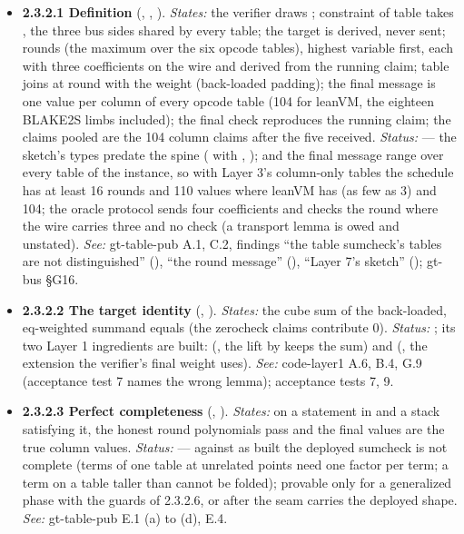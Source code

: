 \begin{itemize}[label={}, leftmargin=1.3em, itemindent=-1.3em, labelwidth=0pt, labelsep=0pt, itemsep=4pt, topsep=3pt]
\item {}\label{obl:node-2.3.2.1}\oblflag\textbf{2.3.2.1 Definition} (, , ). \emph{States:} the verifier draws ; constraint  of table  takes , the three bus sides  shared by every table; the target  is derived, never sent;  rounds (the maximum over the six opcode tables), highest variable first, each with three coefficients  on the wire and  derived from the running claim; table  joins at round  with the weight  (back-loaded padding); the final message is one value per column of every opcode table (104 for leanVM, the eighteen BLAKE2S limbs included); the final check reproduces the running claim; the claims pooled are the 104 column claims after the five received. \emph{Status:}   — the sketch's types predate the spine ( with , );  and the final message range over every table of the instance, so with Layer 3's column-only tables the schedule has at least 16 rounds and 110 values where leanVM has  (as few as 3) and 104; the oracle protocol sends four coefficients and checks the round where the wire carries three and no check (a transport lemma is owed and unstated). \emph{See:} gt-table-pub A.1, C.2, findings ``the table sumcheck's tables are not distinguished'' (), ``the round message'' (), ``Layer 7's sketch'' (); gt-bus §G16.
\item {}\label{obl:node-2.3.2.2}\textbf{2.3.2.2 The target identity} (, ). \emph{States:} the cube sum of the back-loaded, eq-weighted summand equals  (the zerocheck claims contribute 0). \emph{Status:} ; its two Layer 1 ingredients are built:  (, the lift by  keeps the sum) and  (, the extension the verifier's final weight uses). \emph{See:} code-layer1 A.6, B.4, G.9 (acceptance test 7 names the wrong lemma); acceptance tests 7, 9.
\item {}\label{obl:node-2.3.2.3}\oblflag\textbf{2.3.2.3 Perfect completeness} (, ). \emph{States:} on a statement in  and a stack satisfying it, the honest round polynomials pass and the final values are the true column values. \emph{Status:}   — against  as built the deployed sumcheck is not complete (terms of one table at unrelated points need one  factor per term; a term on a table taller than  cannot be folded); provable only for a generalized phase with the guards of 2.3.2.6, or after the seam carries the deployed shape. \emph{See:} gt-table-pub E.1 (a) to (d), E.4.

\end{itemize}
